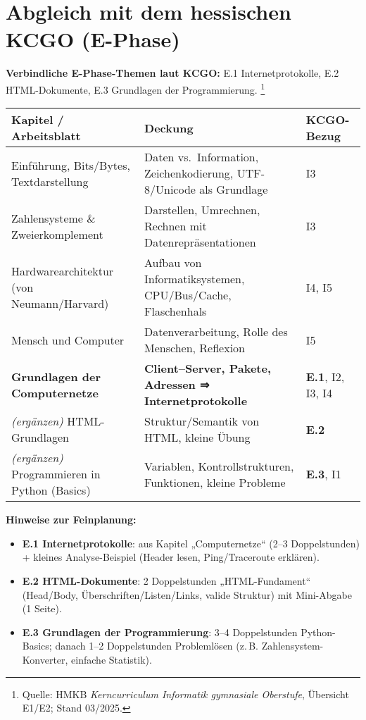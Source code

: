 \section*{Abgleich mit dem hessischen KCGO (E-Phase)}
\small
\noindent\textbf{Verbindliche E-Phase-Themen laut KCGO:} 
E.1 Internetprotokolle, E.2 HTML-Dokumente, E.3 Grundlagen der Programmierung.%
\footnote{Quelle: HMKB \emph{Kerncurriculum Informatik gymnasiale Oberstufe}, Übersicht E1/E2; Stand 03/2025.}

\medskip
\begin{tabularx}{\linewidth}{@{}l X l@{}}
	\toprule
	\textbf{Kapitel / Arbeitsblatt} & \textbf{Deckung} & \textbf{KCGO-Bezug} \\
	\midrule
	Einführung, Bits/Bytes, Textdarstellung & Daten vs.\ Information, Zeichenkodierung, UTF-8/Unicode als Grundlage & I3 \\
	Zahlensysteme \& Zweierkomplement & Darstellen, Umrechnen, Rechnen mit Datenrepräsentationen & I3 \\
	Hardwarearchitektur (von Neumann/Harvard) & Aufbau von Informatiksystemen, CPU/Bus/Cache, Flaschenhals & I4, I5 \\
	Mensch und Computer & Datenverarbeitung, Rolle des Menschen, Reflexion & I5 \\
	\textbf{Grundlagen der Computernetze} & \textbf{Client–Server, Pakete, Adressen ⇒ Internetprotokolle} & \textbf{E.1}, I2, I3, I4 \\
	\emph{(ergänzen)} HTML-Grundlagen & Struktur/Semantik von HTML, kleine Übung & \textbf{E.2} \\
	\emph{(ergänzen)} Programmieren in Python (Basics) & Variablen, Kontrollstrukturen, Funktionen, kleine Probleme & \textbf{E.3}, I1 \\
	\bottomrule
\end{tabularx}

\medskip
\noindent\textbf{Hinweise zur Feinplanung:}
\begin{itemize}
	\item \textbf{E.1 Internetprotokolle}: aus Kapitel „Computernetze“ (2–3 Doppelstunden) + kleines Analyse-Beispiel (Header lesen, Ping/Traceroute erklären).
	\item \textbf{E.2 HTML-Dokumente}: 2 Doppelstunden „HTML-Fundament“ (Head/Body, Überschriften/Listen/Links, valide Struktur) mit Mini-Abgabe (1 Seite).
	\item \textbf{E.3 Grundlagen der Programmierung}: 3–4 Doppelstunden Python-Basics; danach 1–2 Doppelstunden Problemlösen (z.\,B. Zahlensystem-Konverter, einfache Statistik).
\end{itemize}
